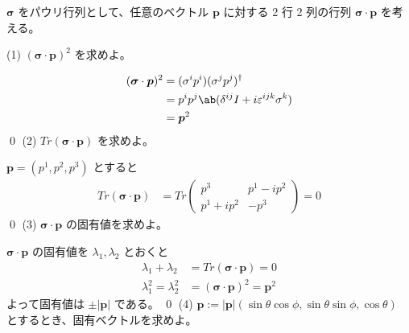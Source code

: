 \documentclass[uplatex,dvipdfmx,a4paper,11pt]{jlreq}
\makeatletter
\theoremstyle{definition}
\renewenvironment{proof}[1][\proofname]{\par
  \normalfont
  \topsep6\p@\@plus6\p@ \trivlist
  \item[\hskip\labelsep{\bfseries #1}\@addpunct{\bfseries}]\ignorespaces\quad\par
}{%
  \qed\endtrivlist\@endpefalse
}
\renewcommand\proofname{証明}
\newcommand{\pp}{\bm{p}}
\numberwithin{equation}{section}
\makeatother
\begin{document}
\begin{problem}
$\bm{\sigma}$ をパウリ行列として、任意のベクトル $\pp$ に対する 2 行 2 列の行列 $\bm{\sigma}\cdot\pp$ を考える。
\end{problem}
(1) $(\bm{\sigma}\cdot\pp)^2$ を求めよ。
\begin{proof}
  \begin{align}
    (\bm{\sigma}\cdot\pp)^2 & = (\sigma^ip^i)(\sigma^jp^j)^\dagger                   \\
                            & = p^ip^j\ab(\delta^{ij}I + i\varepsilon^{ijk}\sigma^k) \\
                            & = \pp^2
  \end{align}
\end{proof}
(2) $Tr(\bm{\sigma}\cdot\pp)$ を求めよ。
\begin{proof}
  $\pp = (p^1, p^2, p^3)$ とすると
  \begin{align}
    Tr(\bm{\sigma}\cdot\pp) & = Tr\begin{pmatrix}
                                    p^3        & p^1 - ip^2 \\
                                    p^1 + ip^2 & -p^3
                                  \end{pmatrix} = 0
  \end{align}
\end{proof}
(3) $\bm{\sigma}\cdot\pp$ の固有値を求めよ。
\begin{proof}
  $\bm{\sigma}\cdot\pp$ の固有値を $\lambda_1, \lambda_2$ とおくと
  \begin{align}
    \lambda_1 + \lambda_2     & = Tr(\bm{\sigma}\cdot\pp) = 0     \\
    \lambda_1^2 = \lambda_2^2 & = (\bm{\sigma}\cdot\pp)^2 = \pp^2
  \end{align}
  よって固有値は $\pm|\pp|$ である。
\end{proof}
(4) $\pp := |\pp|(\sin\theta\cos\phi, \sin\theta\sin\phi, \cos\theta)$ とするとき、固有ベクトルを求めよ。
\end{document}
